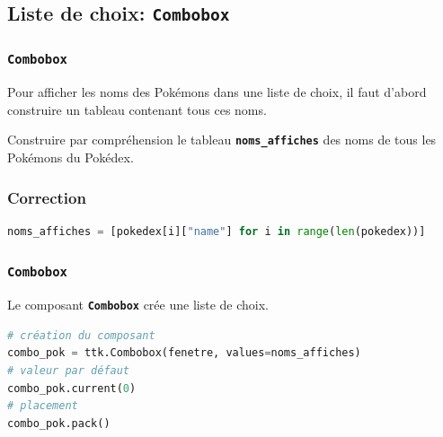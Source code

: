 \documentclass[svgnames,11pt]{beamer}
\begin{document}
\subsection{Liste de choix: \textbf{\texttt{Combobox}}}
\begin{frame}
    \frametitle{\textbf{\texttt{Combobox}}}

Pour afficher les noms des Pokémons dans une liste de choix, il faut d'abord construire un tableau contenant tous ces noms.
\begin{activite}
Construire par compréhension le tableau \textbf{\texttt{noms\_affiches}} des noms de tous les Pokémons du Pokédex.
\end{activite}

\end{frame}
\begin{frame}[fragile]
    \frametitle{Correction}

\begin{center}
\begin{lstlisting}[language=Python,basicstyle=\small,xleftmargin=0em,xrightmargin=0em,numbers=none]
noms_affiches = [pokedex[i]["name"] for i in range(len(pokedex))]
\end{lstlisting}
\label{CODE}
\end{center}  

\end{frame}
\begin{frame}[fragile]
    \frametitle{\textbf{\texttt{Combobox}}}

    Le composant \textbf{\texttt{Combobox}} crée une liste de choix.
    \begin{center}
        \begin{lstlisting}[language=Python,basicstyle=\small]
# création du composant
combo_pok = ttk.Combobox(fenetre, values=noms_affiches)
# valeur par défaut
combo_pok.current(0)
# placement
combo_pok.pack()   
\end{lstlisting}
        \label{CODE}
    \end{center}

\end{frame}
\end{document}
